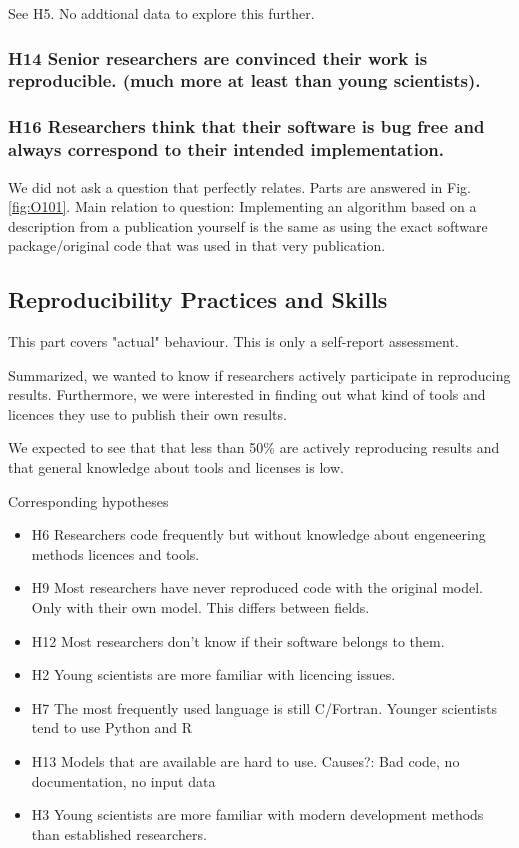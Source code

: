 \documentclass{article}
\begin{document}
See H5. No addtional data to explore this further.

\subsubsection{H14 Senior researchers are convinced their work is reproducible. (much more at least than young scientists).}



\subsubsection{H16 Researchers think that their software is bug free and always correspond to their intended implementation.}
We did not ask a question that perfectly relates. Parts are answered in Fig. \ref{fig:O101}.
Main relation to question: Implementing an algorithm based on a description from a publication yourself is the same as using the exact software package/original code that was used in that very publication.



\newpage

\subsection{Reproducibility Practices and Skills}
This part covers "actual" behaviour. This is only a self-report assessment.

Summarized, we wanted to know if researchers actively participate in reproducing results. Furthermore, we were interested in finding out what kind of tools and licences they use to publish their own results.

We expected to see that that less than 50\% are actively reproducing results and that general knowledge about tools and licenses is low.

Corresponding hypotheses
\begin{itemize}
	\item H6 Researchers code frequently but without knowledge about engeneering methods licences and tools.
	\item H9 Most researchers have never reproduced code with the original model. Only with their own model. This differs between fields.
	\item H12 Most researchers don't know if their software belongs to them.
	\item H2 Young scientists are more familiar with licencing issues.
	\item H7 The most frequently used language is still C/Fortran. Younger scientists tend to use Python and R
	\item H13 Models that are available are hard to use. Causes?: Bad code, no documentation, no input data
	\item H3 Young scientists are more familiar with modern development methods than established researchers.
\end{itemize}
\end{document}
